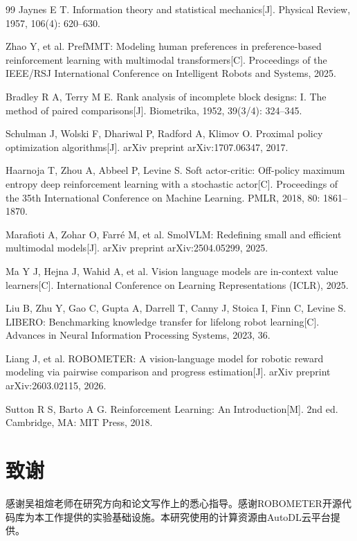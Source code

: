 \begin{thebibliography}{99}
Jaynes E T.
Information theory and statistical mechanics[J].
Physical Review, 1957, 106(4): 620--630.


Zhao Y, et al.
PrefMMT: Modeling human preferences in preference-based reinforcement learning with multimodal transformers[C].
Proceedings of the IEEE/RSJ International Conference on Intelligent Robots and Systems, 2025.

Bradley R A, Terry M E.
Rank analysis of incomplete block designs: I. The method of paired comparisons[J].
Biometrika, 1952, 39(3/4): 324--345.


Schulman J, Wolski F, Dhariwal P, Radford A, Klimov O.
Proximal policy optimization algorithms[J].
arXiv preprint arXiv:1707.06347, 2017.

Haarnoja T, Zhou A, Abbeel P, Levine S.
Soft actor-critic: Off-policy maximum entropy deep reinforcement learning with a stochastic actor[C].
Proceedings of the 35th International Conference on Machine Learning. PMLR, 2018, 80: 1861--1870.

Marafioti A, Zohar O, Farré M, et al.
SmolVLM: Redefining small and efficient multimodal models[J].
arXiv preprint arXiv:2504.05299, 2025.

Ma Y J, Hejna J, Wahid A, et al.
Vision language models are in-context value learners[C].
International Conference on Learning Representations (ICLR), 2025.

Liu B, Zhu Y, Gao C, Gupta A, Darrell T, Canny J, Stoica I, Finn C, Levine S.
LIBERO: Benchmarking knowledge transfer for lifelong robot learning[C].
Advances in Neural Information Processing Systems, 2023, 36.

Liang J, et al.
ROBOMETER: A vision-language model for robotic reward modeling via pairwise comparison and progress estimation[J].
arXiv preprint arXiv:2603.02115, 2026.

Sutton R S, Barto A G.
Reinforcement Learning: An Introduction[M].
2nd ed. Cambridge, MA: MIT Press, 2018.


\end{thebibliography}



\clearpage
\section*{致谢}

感谢吴祖煊老师在研究方向和论文写作上的悉心指导。感谢ROBOMETER\cite{liang2026}开源代码库为本工作提供的实验基础设施。本研究使用的计算资源由AutoDL云平台提供。




